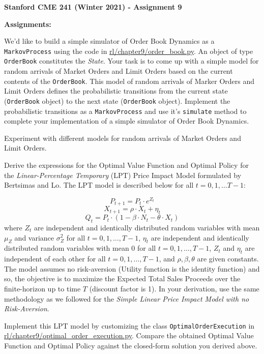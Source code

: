 \documentclass[12pt]{exam}
\begin{document}
\begin{center}
{\large {\bf Stanford CME 241 (Winter 2021) - Assignment 9}}
\end{center}
 
{\large{\bf Assignments:}}
\begin{questions}
\question We'd like to build a simple simulator of Order Book Dynamics as a \lstinline{MarkovProcess} using the code in \href{https://github.com/TikhonJelvis/RL-book/blob/master/rl/chapter9/order_book.py}{rl\//chapter9\//order\_book.py}. An object of type \lstinline{OrderBook} constitutes the {\em State}. Your task is to come up with a simple model for random arrivals of Market Orders and Limit Orders based on the current contents of the \lstinline{OrderBook}. This model of random arrivals of Marker Orders and Limit Orders defines the probabilistic transitions from the current state (\lstinline{OrderBook} object) to the next state (\lstinline{OrderBook} object). Implement the probabilistic transitions as a \lstinline{MarkovProcess} and use it's \lstinline{simulate} method to complete your implementation of a simple simulator of Order Book Dynamics.

Experiment with different models for random arrivals of Market Orders and Limit Orders.

\question Derive the expressions for the Optimal Value Function and Optimal Policy for the {\em Linear-Percentage Temporary} (LPT) Price Impact Model formulated by Bertsimas and Lo. The LPT model is described below for all $t = 0, 1, \ldots T-1$:

$$P_{t+1} = P_t \cdot e^{Z_t}$$
$$X_{t+1} = \rho \cdot X_t + \eta_t$$
$$Q_t = P_t \cdot (1 - \beta \cdot N_t - \theta \cdot X_t)$$
where $Z_t$ are independent and identically distributed random variables with mean $\mu_Z$ and variance $\sigma^2_Z$ for all $t = 0, 1, \ldots, T-1$, $\eta_t$ are independent and identically distributed random variables with mean 0 for all $t = 0, 1, \ldots, T-1$, $Z_t$ and $\eta_t$ are independent of each other for all $t = 0, 1, \ldots, T-1$, and $\rho, \beta, \theta$ are given constants. The model assumes no risk-aversion (Utility function is the identity function) and so, the objective is to maximize the Expected Total Sales Proceeds over the finite-horizon up to time $T$ (discount factor is 1). In your derivation, use the same methodology as we followed for the {\em Simple Linear Price Impact Model with no Risk-Aversion}.

Implement this LPT model by customizing the class \lstinline{OptimalOrderExecution} in \href{https://github.com/TikhonJelvis/RL-book/blob/master/rl/chapter9/optimal_order_execution.py}{rl\//chapter9\//optimal\_order\_execution.py}.  Compare the obtained Optimal Value Function and Optimal Policy against the closed-form solution you derived above.

\end{questions}
\end{document}
